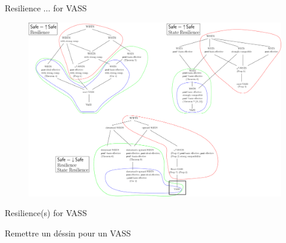\documentclass{beamer}
\begin{document}
  \begin{frame}{Resilience $\ldots$ for VASS}
 
   \begin{center}
 	\begin{figure}
 	\vspace{-0.25cm}
\includegraphics[width=1.00\textwidth]{resultC}
	\end{figure}
\end{center}  


  \end{frame}
  \begin{frame}{Resilience(s) for VASS}
  
  Remettre un déssin pour un VASS

  \end{frame}
\end{document}
